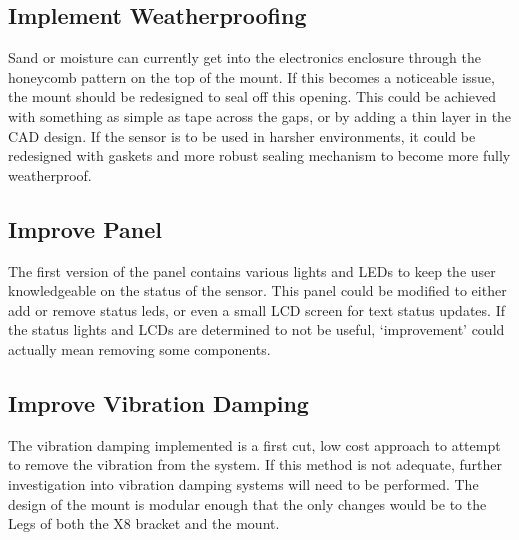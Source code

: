 	\subsection{Implement Weatherproofing}
	Sand or moisture can currently get into the electronics enclosure through the honeycomb pattern on the top of the mount.  If this becomes a noticeable issue, the mount should be redesigned to seal off this opening. This could be achieved with something as simple as tape across the gaps, or by adding a thin layer in the CAD design.  If the sensor is to be used in harsher environments, it could be redesigned with gaskets and more robust sealing mechanism to become more fully weatherproof.
	\subsection{Improve Panel}
	The first version of the panel contains various lights and LEDs to keep the user knowledgeable on the status of the sensor.  This panel could be modified to either add or remove status leds, or even a small LCD screen for text status updates.  If the status lights and LCDs are determined to not be useful, `improvement' could actually mean removing some components.
	\subsection{Improve Vibration Damping}
	The vibration damping implemented is a first cut, low cost approach to attempt to remove the vibration from the system.  If this method is not adequate, further investigation into vibration damping systems will need to be performed.  The design of the mount is modular enough that the only changes would be to the Legs of both the X8 bracket and the mount.  